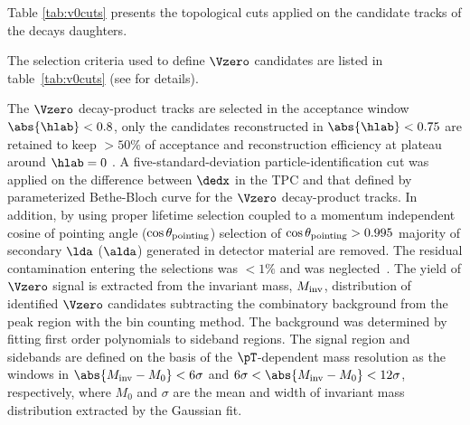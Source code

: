 Table \ref{tab:v0cuts} presents the topological cuts applied on the candidate tracks of the decays daughters. 


The selection criteria used to define $\Vzero$ candidates are listed in table~\ref{tab:v0cuts} (see \cite{Aamodt:2011zza} for details).

The $\Vzero$ decay-product tracks are selected in the acceptance window $\abs{\hlab}<0.8$, only the candidates reconstructed in $\abs{\hlab}<0.75$ are retained to keep $>50\%$ of acceptance and reconstruction efficiency at plateau around $\hlab=0$ .
A five-standard-deviation particle-identification cut was applied on the difference between $\dedx$ in the TPC and that defined by parameterized Bethe-Bloch curve for the $\Vzero$ decay-product tracks.
In addition, by using proper lifetime selection coupled to a momentum independent cosine of pointing angle ($\cos\theta_{\rm pointing}$) selection of $\cos\theta_{\rm pointing}>0.995$ majority of secondary $\lda$ ($\alda$) generated in detector material are removed.
The residual contamination entering the selections was $<1\%$ and was neglected~\cite{Abelev:2013xaa}.
The yield of $\Vzero$ signal is extracted from the invariant mass, $M_{\rm inv}$, distribution of identified $\Vzero$ candidates subtracting the combinatory background from the peak region with the bin counting method.
The background was determined by fitting first order polynomials to sideband regions.
The signal region and sidebands are defined on the basis of the $\pT$-dependent mass resolution as the windows in $\abs{M_{\rm inv}-M_{0}}<6\sigma$ and $6\sigma<\abs{M_{\rm inv}-M_{0}}<12\sigma$, respectively, where $M_{0}$ and $\sigma$ are the mean and width of invariant mass distribution extracted by the Gaussian fit.

